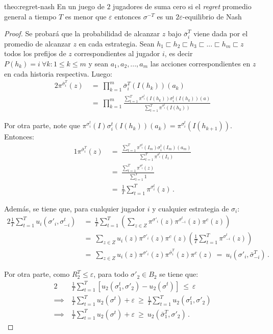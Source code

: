 \begin{reptheorem}{theo:regret-nash}
En un juego de $2$ jugadores de suma cero si el \textit{regret} promedio general a tiempo $T$ es menor que $\varepsilon$ entonces $\sigma^{-T}$ es un $2\varepsilon$-equilibrio de Nash
\end{reptheorem}

\begin{proof}
Se probará que la probabilidad de alcanzar $z$ bajo $\bar{\sigma}_i^T$ viene dada por el promedio de alcanzar $z$ en  cada estrategia. Sean $h_1 \sqsubset h_2 \sqsubset h_3 \sqsubset ... \sqsubset h_m \sqsubset z$ todos los prefijos de $z$ correspondientes al jugador $i$, es decir $P(h_k) = i\ \forall k : 1 \leq k \leq m$ y sean $a_1, a_2, ..., a_m$ las acciones correspondientes en $z$ en cada historia respectiva. Luego:
\begin{alignat}{2}
\pi^{\bar{\sigma}_i^T}(z)\ &=\ \prod_{k = 1}^m \bar{\sigma}_i^T(I(h_k))(a_k) \\	&=\ \prod_{k = 1}^m \frac{\sum_{t = 1}^{T}  \pi^{\sigma_i^t}(I(h_k))\sigma^t_i(I(h_k))(a)}{\sum_{t = 1}^T \pi^{\sigma_i^t}(I(h_k))}
\end{alignat}

Por otra parte, note que $\pi^{\sigma_i^t}(I)\sigma_i^t(I(h_k))(a_k) = \pi^{\sigma_i^t}(I(h_{k+1}))$. Entonces:
\begin{alignat}{1}
	\pi^{\bar{\sigma}_i^T}(z)\ &=\ \frac{\sum_{t = 1}^T\pi^{\sigma_i^t}(I_m) \sigma_i^t(I_m)(a_m)}{\sum_{t = 1}^T \pi^{\sigma_i^t}(I_1)} \\
	&=\ \frac{\sum_{t = 1}^T \pi^{\sigma_i^t}(z)}{\sum_{t = 1}^T 1} \\
	&=\ \frac{1}{T} \sum_{t = 1}^T \pi^{\sigma_i^t}(z) \,.
\end{alignat}

Además, se tiene que, para cualquier jugador $i$ y cualquier estrategia de $\sigma_i$:
\begin{alignat}{2}
\frac{1}{T} \sum_{t = 1}^T u_i(\sigma'_i, \sigma_{-i}^t)\ &=\ \frac{1}{T} \sum_{t = 1}^T \left( \sum_{z \in Z} \pi^{\sigma'_i}(z) \pi^{\sigma_{-i}^t}(z) \pi^c(z) \right) \\
	&=\ \sum_{z \in Z} u_i(z) \pi^{\sigma'_i}(z) \pi^c(z) \left( \frac{1}{T} \sum_{t = 1}^T \pi^{\sigma_{-i}^t}(z) \right) \\
	&=\ \sum_{z \in Z} u_i(z) \pi^{\sigma'_i}(z) \pi^{\bar{\sigma}_i^T}(z) \pi^c(z)\ =\ u_i(\sigma'_i, \bar{\sigma}_{-i}^T) \,.
\end{alignat}

Por otra parte, como $R_2^T \leq \varepsilon$, para todo $\sigma'_2 \in B_2$ se tiene que:
\begin{alignat}{2}
	& \frac{1}{T} \sum_{t = 1}^T[u_2(\sigma_1^t, \sigma'_2) - u_2(\sigma^t)]\  \leq\  \varepsilon\\
	\implies\ & \frac{1}{T} \sum_{t = 1}^T u_2(\sigma^t) + \varepsilon\  \geq\  \frac{1}{T} \sum_{t = 1}^T u_2(\sigma_1^t, \sigma'_2) \\
	\implies\ & \frac{1}{T} \sum_{t = 1}^T u_2(\sigma^t) + \varepsilon\ \geq\ u_2(\bar{\sigma}_1^T, \sigma'_2) \,.
\end{alignat}


\end{proof}
